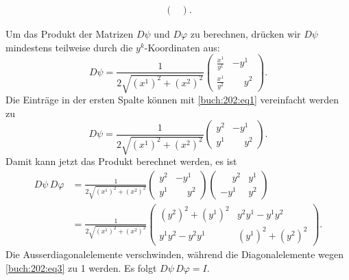 \begin{loesung}
\begin{teilaufgaben}
\begin{align*}
\begin{pmatrix}
\end{pmatrix}.
\end{align*}
\item
Um das Produkt der Matrizen $D\psi$ und $D\varphi$ zu berechnen,
drücken wir $D\psi$ mindestens teilweise durch die $y^k$-Koordinaten
aus:
\[
D\psi
=
\frac{1}{
2\!\sqrt{(x^1)^2 +(x^2)^2}
}
\begin{pmatrix}
\displaystyle
\frac{x^1}{y^1}
&
\displaystyle
-y^1
\\
\displaystyle
\frac{x^1}{y^2}
&
\displaystyle
\phantom{-}
y^2
\end{pmatrix}.
\]
Die Einträge in der ersten Spalte können mit \eqref{buch:202:eq1} 
vereinfacht werden zu
\[
D\psi
=
\frac{1}{ 2\!\sqrt{(x^1)^2 +(x^2)^2} }
\begin{pmatrix}
y^2 & -y^1 \\
y^1 & \phantom{-} y^2
\end{pmatrix}.
\]
Damit kann jetzt das Produkt berechnet werden, es ist
\begin{align*}
D\psi\, D\varphi
&=
\frac{1}{ 2\!\sqrt{(x^1)^2 +(x^2)^2} }
\begin{pmatrix}
y^2 & -y^1 \\
y^1 & \phantom{-} y^2
\end{pmatrix}
\begin{pmatrix}
\phantom{-}y^2 & y^1 \\
         - y^1 & y^2
\end{pmatrix}
\\
&=
\frac{1}{ 2\!\sqrt{(x^1)^2 +(x^2)^2} }
\begin{pmatrix}
(y^2)^2+(y^1)^2 & y^2y^1-y^1y^2 \\
y^1y^2 - y^2y^1 & (y^1)^2+(y^2)^2
\end{pmatrix}.
\end{align*}
Die Ausserdiagonalelemente verschwinden, während die
Diagonalelemente wegen \eqref{buch:202:eq3} zu 1 werden.
Es folgt $D\psi\,D\varphi = I$.
\qedhere
\end{teilaufgaben}
\end{loesung}
